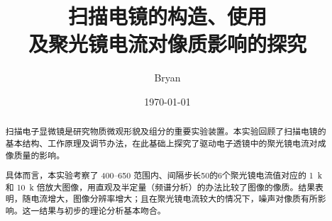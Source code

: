 \documentclass[aps,pre,12pt,preprint,%
	onecolumn,showpacs,showkeys,nofootinbib]{revtex4-1}
\begin{document}
	\title{%
	\texstringonly{\hfil\\[2\baselineskip]}
	\sf\LARGE%
		扫描电镜的构造、使用\\
		及聚光镜电流对像质影响的探究%
	\texstringonly{\vspace{3ex}}}
	\author{\fangsong\large%
		Bryan%
	\vspace{2mm}}
	\date{\today}

\begin{abstract}
\vspace{10mm}
\begin{spacing}{1.5}\normalsize
\setlength{\parskip}{.3\baselineskip}
	扫描电子显微镜是研究物质微观形貌及组分的重要实验装置。本实验回顾了扫描电镜的基本结构、工作原理及调节办法，在此基础上探究了驱动电子透镜中的聚光镜电流对成像质量的影响。
	
	具体而言，本实验考察了 \numrange{400}{650} 范围内、间隔步长50的6个聚光镜电流值对应的 \SI{1}{k} 和 \SI{10}{k} 倍放大图像，用直观及半定量（频谱分析）的办法比较了图像的像质。结果表明，随电流增大，图像分辨率增大；且在聚光镜电流较大的情况下，噪声对像质有所影响。这一结果与初步的理论分析基本吻合。
\end{spacing}
\end{abstract}

\maketitle
\thispagestyle{titlepagestyle}

\end{document}
